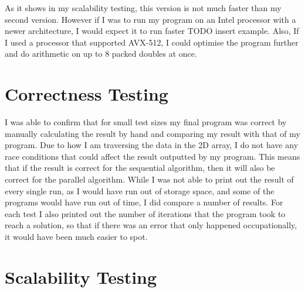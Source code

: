 \documentclass{report}
\begin{document}
As it shows in my scalability testing, this version is not much faster than my second version. However if I was to run my program on an Intel processor with a newer architecture, I would expect it to run faster TODO insert example. Also, If I used a processor that supported AVX-512, I could optimise the program further and do arithmetic on up to 8 packed doubles at once.
\chapter{Correctness Testing}
I was able to confirm that for small test sizes my final program was correct by manually calculating the result by hand and comparing my result with that of my program. Due to how I am traversing the data in the 2D array, I do not have any race conditions that could affect the result outputted by my program. This means that if the result is correct for the sequential algorithm, then it will also be correct for the parallel algorithm. While I was not able to print out the result of every single run, as I would have run out of storage space, and some of the programs would have run out of time, I did compare a number of results. For each test I also printed out the number of iterations that the program took to reach a solution, so that if there was an error that only happened occupationally, it would have been much easier to spot.
\chapter{Scalability Testing}
\end{document}
